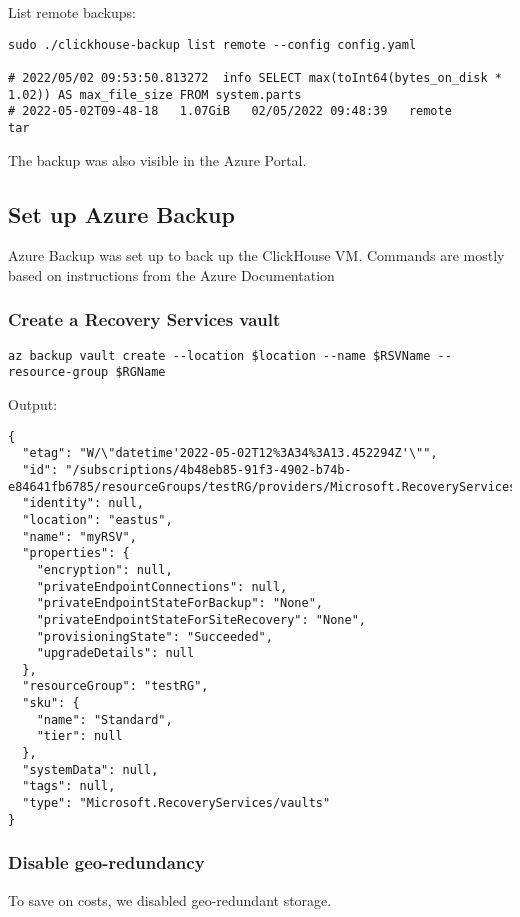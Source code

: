 List remote backups:
\begin{verbatim}
sudo ./clickhouse-backup list remote --config config.yaml

# 2022/05/02 09:53:50.813272  info SELECT max(toInt64(bytes_on_disk * 1.02)) AS max_file_size FROM system.parts
# 2022-05-02T09-48-18   1.07GiB   02/05/2022 09:48:39   remote      tar
\end{verbatim}

The backup was also visible in the Azure Portal.

\subsection{Set up Azure Backup}
\label{sec:org6963b1d}
Azure Backup was set up to back up the ClickHouse VM.
Commands are mostly based on instructions from the Azure Documentation \cite{v-amallick_quickstart_nodate}

\subsubsection{Create a Recovery Services vault}
\label{sec:org05625d6}
\begin{verbatim}
az backup vault create --location $location --name $RSVName --resource-group $RGName
\end{verbatim}

Output:
\begin{verbatim}
{
  "etag": "W/\"datetime'2022-05-02T12%3A34%3A13.452294Z'\"",
  "id": "/subscriptions/4b48eb85-91f3-4902-b74b-e84641fb6785/resourceGroups/testRG/providers/Microsoft.RecoveryServices/vaults/myRSV",
  "identity": null,
  "location": "eastus",
  "name": "myRSV",
  "properties": {
    "encryption": null,
    "privateEndpointConnections": null,
    "privateEndpointStateForBackup": "None",
    "privateEndpointStateForSiteRecovery": "None",
    "provisioningState": "Succeeded",
    "upgradeDetails": null
  },
  "resourceGroup": "testRG",
  "sku": {
    "name": "Standard",
    "tier": null
  },
  "systemData": null,
  "tags": null,
  "type": "Microsoft.RecoveryServices/vaults"
}
\end{verbatim}

\subsubsection{Disable geo-redundancy}
\label{sec:orgf8d56a4}
To save on costs, we disabled geo-redundant storage.

